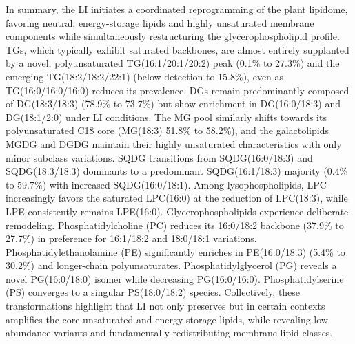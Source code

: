 \documentclass[10pt,letterpaper]{article}
\begin{document}
\bigskip
In summary, the LI initiates a coordinated reprogramming of the plant lipidome, favoring neutral, energy-storage lipids and highly unsaturated membrane components while simultaneously restructuring the glycerophospholipid profile. TGs, which typically exhibit saturated backbones, are almost entirely supplanted by a novel, polyunsaturated TG(16:1/20:1/20:2) peak (0.1\% to 27.3\%) and the emerging TG(18:2/18:2/22:1) (below detection to 15.8\%), even as TG(16:0/16:0/16:0) reduces its prevalence. DGs remain predominantly composed of DG(18:3/18:3) (78.9\% to 73.7\%) but show enrichment in DG(16:0/18:3) and DG(18:1/2:0) under LI conditions. The MG pool similarly shifts towards its polyunsaturated C18 core (MG(18:3) 51.8\% to 58.2\%), and the galactolipids MGDG and DGDG maintain their highly unsaturated characteristics with only minor subclass variations. SQDG transitions from SQDG(16:0/18:3) and SQDG(18:3/18:3) dominants to a predominant SQDG(16:1/18:3) majority (0.4\% to 59.7\%) with increased SQDG(16:0/18:1). Among lysophospholipids, LPC increasingly favors the saturated LPC(16:0) at the reduction of LPC(18:3), while LPE consistently remains LPE(16:0). Glycerophospholipids experience deliberate remodeling. Phosphatidylcholine (PC) reduces its 16:0/18:2 backbone (37.9\% to 27.7\%) in preference for 16:1/18:2 and 18:0/18:1 variations. Phosphatidylethanolamine (PE) significantly enriches in PE(16:0/18:3) (5.4\% to 30.2\%) and longer-chain polyunsaturates. Phosphatidylglycerol (PG) reveals a novel PG(16:0/18:0) isomer while decreasing PG(16:0/16:0). Phosphatidylserine (PS) converges to a singular PS(18:0/18:2) species. Collectively, these transformations highlight that LI not only preserves but in certain contexts amplifies the core unsaturated and energy-storage lipids, while revealing low-abundance variants and fundamentally redistributing membrane lipid classes.
\end{document}
